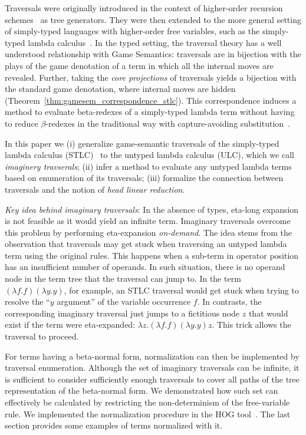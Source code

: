 \documentclass{elsarticle}
\theoremstyle{plain}
\theoremstyle{definition}
\theoremstyle{remark}
\begin{document}
Traversals were originally introduced in the context of higher-order recursion schemes~\cite{Ong2006} as tree generators.
They were then extended to the more general setting of simply-typed languages with higher-order free variables, such as the simply-typed lambda calculus~\cite{BlumPhd}. In the typed setting, the traversal theory has a well understood relationship with Game Semantics: traversals are in bijection with the plays of the game denotation of a term in which all the internal moves are revealed. Further, taking the \emph{core projections} of traversals yields a bijection with the standard game denotation, where internal moves are hidden (Theorem~\ref{thm:gamesem_correspondence_stlc}). This correspondence induces a method to evaluate beta-redexes of a simply-typed lambda term without having to reduce $\beta$-redexes in the traditional way with capture-avoiding substitution~\cite{danos-head,BlumPhd,BlumGalop2008,Blum-LocalBeta2008}.

In this paper we (i) generalize game-semantic traversals of the simply-typed lambda calculus (STLC)~\cite{BlumPhd} to the untyped lambda calculus (ULC), which we call \emph{imaginery travserals}; (ii) infer a method to evaluate any untyped lambda terms based on enumeration of its traversals; (iii) formalize the connection between traversals and the notion of \emph{head linear reduction}.

\emph{Key idea behind imaginary traversals}: In the absence of types, eta-long expansion is not feasible as it would yield an infinite term. Imaginary traversals overcome this problem by performing eta-expansion \emph{on-demand}. The idea stems from the observation that traversals may get stuck when traversing an untyped lambda term using the original rules.
This happens when a sub-term in operator position has an insufficient number of operands. In such situation, there is no operand node in the term tree that the traversal can jump to.
In the term $(\lambda f.f)(\lambda y.y)$, for example, an STLC traversal would get stuck when trying to resolve the ``$y$ argument'' of the variable occurrence $f$.
In contrasts, the corresponding imaginary traversal just jumps to a fictitious node $z$ that would exist if the term were eta-expanded: $\lambda z. (\lambda f.f)(\lambda y.y) z$. This trick allows the traversal to proceed.

For terms having a beta-normal form, normalization can then be implemented by traversal enumeration. Although the set of imaginary traversals can be infinite, it is sufficient to consider sufficiently enough traversals to cover all paths of the tree representation of the beta-normal form. We demonstrated how such set can effectively be calculated by restricting the non-determinism of the free-variable rule. We implemented the normalization procedure in the HOG tool~\cite{Blum-HogTool}. The last section provides some examples of terms normalized with it.
\end{document}

